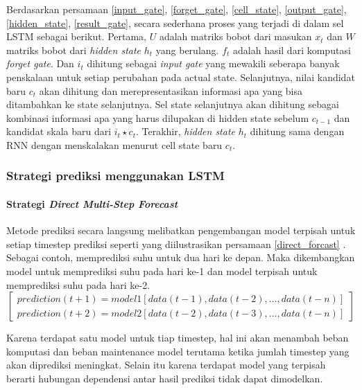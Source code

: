 \documentclass[../thesis.tex]{subfiles}
\begin{document}
Berdasarkan persamaan \ref{input_gate}, \ref{forget_gate}, \ref{cell_state}, \ref{output_gate}, \ref{hidden_state}, \ref{result_gate}, secara sederhana proses yang terjadi di dalam sel LSTM sebagai berikut. Pertama, $U$ adalah matriks bobot dari masukan $x_{t}$ dan $W$ matriks bobot dari \textit{hidden state} $h_{t}$ yang berulang. 
$f_{t}$ adalah hasil dari komputasi \textit{forget gate}. Dan $i_{t}$ dihitung sebagai \textit{input gate} yang mewakili seberapa banyak penskalaan untuk setiap perubahan pada actual state. 
Selanjutnya, nilai kandidat baru $c_t$ akan dihitung dan merepresentasikan informasi apa yang bisa ditambahkan ke state selanjutnya. 
Sel state selanjutnya akan dihitung sebagai kombinasi informasi apa yang harus dilupakan di hidden state sebelum $c_{t-1}$ dan kandidat skala baru dari $i_{t} \star c_{t}$. 
Terakhir, \textit{hidden state} $h_{t}$ dihitung sama dengan RNN dengan menskalakan menurut cell state baru $c_t$.

\subsubsection{Strategi prediksi menggunakan LSTM}
\paragraph{Strategi \textit{Direct Multi-Step Forecast}}

Metode prediksi secara langsung melibatkan pengembangan model terpisah untuk setiap timestep prediksi seperti yang diilustrasikan persamaan \ref{direct_forcast} \cite{Forecast_Strategy}.
Sebagai contoh, memprediksi suhu untuk dua hari ke depan. Maka dikembangkan model untuk memprediksi suhu pada hari ke-1 dan model terpisah untuk memprediksi suhu pada hari ke-2.
\begin{equation} \label{direct_forcast}
\begin{bmatrix}
	prediction(t+1) = model1[data(t-1), data(t-2), ..., data(t-n)]
	\\prediction(t+2) = model2[data(t-2), data(t-3), ..., data(t-n)]
\end{bmatrix}
\end{equation}

Karena terdapat satu model untuk tiap timestep, hal ini akan menambah beban komputasi dan beban maintenance model terutama ketika jumlah timestep yang akan diprediksi meningkat. Selain itu
karena terdapat model yang terpisah berarti hubungan dependensi antar hasil prediksi tidak dapat dimodelkan.
\end{document}

